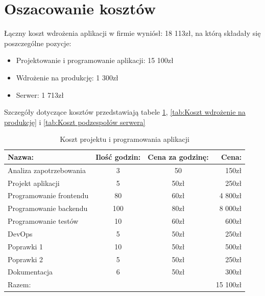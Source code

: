\documentclass[12pt,a4paper]{article}
\begin{document}
	\section{Oszacowanie kosztów}
		\indent Łączny koszt wdrożenia aplikacji w firmie wyniósł: 18 113zł, na którą składały się poszczególne pozycje:
		\begin{itemize}
			\item Projektowanie i programowanie aplikacji: 15 100zł
			\item Wdrożenie na produkcję: 1 300zł
			\item Serwer: 1 713zł
		\end{itemize}
		Szczegóły dotyczące kosztów przedstawiają tabele \ref{tab:Koszt projektu i programowania aplikacji}, \ref{tab:Koszt wdrożenie na produkcję} i \ref{tab:Koszt podzespołów serwera} 
		\begin{table}[!hbp]
			\center
			\begin{tabular}{|l|c|c|r|}
				\hline
				Nazwa: & Ilość godzin: & Cena za godzinę: & Cena: \\
				\hline
				Analiza zapotrzebowania & 3 & 50 & 150zł\\
				\hline
				Projekt aplikacji & 5 & 50zł & 250zł\\
				\hline
				Programowanie frontendu & 80 & 60zł & 4 800zł\\
				\hline
				Programowanie backendu & 100 & 80zł & 8 000zł\\
				\hline
				Programowanie testów & 10 & 60zł & 600zł\\
				\hline
				DevOps & 5 & 50zł & 250zł\\
				\hline
				Poprawki 1 & 10 & 50zł & 500zł\\
				\hline
				Poprawki 2 & 5 & 50zł & 250zł\\
				\hline
				Dokumentacja & 6 & 50zł & 300zł\\
				\hline
				\multicolumn{3}{|l|}{Razem:} & 15 100zł\\
				\hline
			\end{tabular}
			\caption{Koszt projektu i programowania aplikacji}
			\label{tab:Koszt projektu i programowania aplikacji}
		\end{table}		
				
\end{document}

